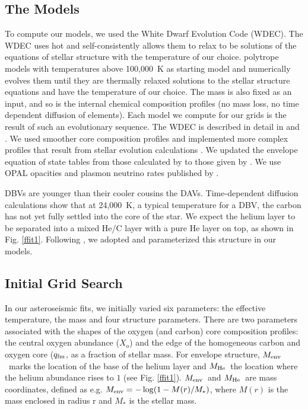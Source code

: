 \documentclass[12pt,preprint]{aastex}
\newcommand{\menv}{$M_{\rm env}$}
\newcommand{\mhe}{$M_{\rm He}$}
\newcommand{\xo}{$X_o$}
\newcommand{\qfm}{$q_{\rm fm}$}
\begin{document}
\subsection{The Models}
\label{models}

To compute our models, we used the White Dwarf Evolution Code (WDEC). The WDEC uses hot  and self-consistently allows them to relax to be solutions of the equations of stellar structure with the temperature of our choice.
polytrope models with temperatures above 100{,}000~K as starting model and numerically evolves them until they are thermally relaxed 
solutions to the stellar structure equations and have the temperature of our choice. The mass is also fixed as an input, and so is the internal chemical composition profiles (no mass loss, no time dependent diffusion of elements). Each model we compute for our grids is the result 
of such an evolutionary sequence. The WDEC is described in detail in \citet{Lamb75} and 
\citet{Wood90}. We used smoother core composition profiles and implemented more complex profiles 
that result from stellar evolution calculations \citep{Salaris97}. We updated the envelope 
equation of state tables from those calculated by \citet{Fontaine77} to those given by 
\citet{Saumon95}. We use OPAL opacities \citep{Iglesias96} and plasmon neutrino rates 
published by \citet{Itoh96}. 

DBVs are younger than their cooler cousins the DAVs. Time-dependent diffusion calculations 
\citep[e.g.][]{Dehner95,Althaus05} show that at 24{,}000~K, a typical temperature for a DBV, 
the carbon has not yet fully settled into the core of the star. We expect the helium layer to 
be separated into a mixed He/C layer with a pure He layer on top, as shown in Fig. \ref{ffit1}. 
Following \citet{Metcalfe05a}, we adopted and parameterized this structure in our models. 

\subsection{Initial Grid Search}
\label{grids}

In our asteroseismic fits, we initially varied six parameters: the effective temperature, 
the mass and four structure parameters. There are two parameters associated with the shapes 
of the oxygen (and carbon) core composition profiles: the central oxygen abundance (\xo) and 
the edge of the homogeneous carbon and oxygen core (\qfm, as a fraction of stellar mass. 
For envelope structure, \menv\ marks the location of the base of the helium layer 
and \mhe\ the location where the helium abundance rises to $1$ (see Fig. \ref{ffit1}). 
\menv\ and \mhe\ are mass coordinates, defined as e.g. $M_{\rm env} = -\log(1 - M(r)/M_*)$, 
where $M(r)$ is the mass enclosed in radius r and $M_*$ is the stellar mass. 
\end{document}
